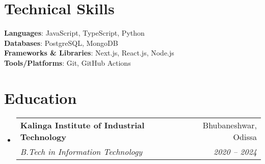 \documentclass[letterpaper,11pt]{article}
\makeatletter
\newcommand{\resumeSubheading}[4]{
  \vspace{-2pt}\item
    \begin{tabular*}{0.97\textwidth}[t]{l@{\extracolsep{\fill}}r}
      \textbf{#1} & #2 \\
      \textit{\small#3} & \textit{\small #4} \\
    \end{tabular*}\vspace{-7pt}
}
\newcommand{\resumeSubHeadingListStart}{\begin{itemize}[leftmargin=0.15in, label={}]}
\newcommand{\resumeSubHeadingListEnd}{\end{itemize}}
\makeatother
\begin{document}
\section{Technical Skills}
\begin{itemize}[leftmargin=0.15in, label={}]
	\small{\item{
		\textbf{Languages}{: JavaScript, TypeScript, Python} \\
		\textbf{Databases}{: PostgreSQL, MongoDB} \\
		\textbf{Frameworks \& Libraries}{: Next.js, React.js, Node.js} \\
		\textbf{Tools/Platforms}{: Git, GitHub Actions}
    }}
\end{itemize}

\section{Education}
\resumeSubHeadingListStart
\resumeSubheading
{Kalinga Institute of Industrial Technology}{Bhubaneshwar, Odissa}
{B.Tech in Information Technology}{2020 -- 2024}
\resumeSubHeadingListEnd
\end{document}
